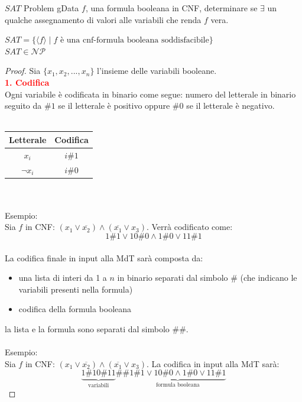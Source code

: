 \documentclass{article}  %
\theoremstyle{definition}
\begin{document}
\begin{theorem}{$SAT$ Problem}
	gData $f$, una formula booleana in CNF, determinare se $\exists$ un qualche assegnamento di valori alle variabili che renda $f$ vera.
	\begin{center}
		$SAT = \{\langle f \rangle \mid f \text{ è una cnf-formula booleana soddisfacibile}\}$ \\
		$SAT \in \mathcal{NP}$
	\end{center}
	\footnotesize
	\begin{proof}
		Sia $\{x_1,x_2,...,x_n\}$ l'insieme delle variabili booleane. \\
		\textbf{\textcolor{red}{1. Codifica}} \\
		Ogni variabile è codificata in binario come segue: numero del letterale in binario seguito da $\#1$ se il letterale è positivo
		oppure $\#0$ se il letterale è negativo. \\ \\
		\begin{tabular}{|c|c|}
			\hline
			\textbf{Letterale} & \textbf{Codifica} \\ \hline
			$x_i$              & $i \# 1$          \\ \hline
			$\lnot x_i$        & $i \# 0$          \\ \hline
		\end{tabular} \\ \\
		Esempio: \\
		Sia $f$ in CNF: $(x_1 \lor \overline{x_2}) \land (\overline{x_1} \lor x_3)$. Verrà codificato come:
		\[
			1\#1 \lor 10\#0 \land 1\#0 \lor 11\#1
		\]
		\\
		La codifica finale in input alla MdT sarà composta da:
		\begin{itemize}
			\item una lista di interi da 1 a $n$ in binario separati dal simbolo \# (che indicano le variabili presenti nella formula)
			\item codifica della formula booleana
		\end{itemize}
		la lista e la formula sono separati dal simbolo \#\#. \\ \\
		Esempio: \\
		Sia $f$ in CNF: $(x_1 \lor \overline{x_2}) \land (\overline{x_1} \lor x_3)$. La codifica in input alla MdT sarà:
		\[
			\underbrace{1\#10\#11}_{\text{variabili}}
			\#\#
			\underbrace{1\#1 \lor 10\#0 \land 1\#0 \lor 11\#1}_{\text{formula booleana}}
\]
\end{proof}
\end{theorem}
\end{document}
